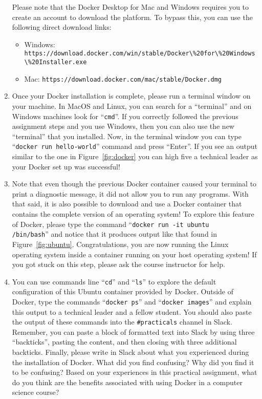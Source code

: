 \documentclass[11pt]{article}
\newcommand{\command}[1]{``\lstinline{#1}''}
\newcommand{\url}[1]{\lstinline{#1}}
\begin{document}
\begin{enumerate}
      Please note that the Docker Desktop for Mac and Windows requires you to
      create an account to download the platform. To bypass this, you can use
      the following direct download links:

    \begin{itemize}
        \item Windows: \\ \url{https://download.docker.com/win/stable/Docker\%20for\%20Windows\%20Installer.exe}
        \item Mac: \url{https://download.docker.com/mac/stable/Docker.dmg}
    \end{itemize}

  \item Once your Docker installation is complete, please run a terminal window
    on your machine. In MacOS and Linux, you can search for a ``terminal'' and
    on Windows machines look for \command{cmd}. If you correctly followed the
    previous assignment steps and you use Windows, then you can also use the new
    ``terminal'' that you installed. Now, in the terminal window you can type
    \command{docker run hello-world} command and press ``Enter''. If you see an
    output similar to the one in Figure~\ref{fig:docker} you can high five a
    technical leader as your Docker set up was successful!

  \item Note that even though the previous Docker container caused your terminal
    to print a diagnostic message, it did not allow you to run any programs.
    With that said, it is also possible to download and use a Docker container
    that contains the complete version of an operating system! To explore this
    feature of Docker, please type the command \command{docker run -it ubuntu
    /bin/bash} and notice that it produces output like that found in
    Figure~\ref{fig:ubuntu}. Congratulations, you are now running the Linux
    operating system inside a container running on your host operating system!
    If you got stuck on this step, please ask the course instructor for help.

  \item You can use commands line \command{cd} and \command{ls} to explore the
    default configuration of this Ubuntu container provided by Docker. Outside
    of Docker, type the commands \command{docker ps} and \command{docker images}
    and explain this output to a technical leader and a fellow student. You
    should also paste the output of these commands into the \url{#practicals}
    channel in Slack. Remember, you can paste a block of formatted text into
    Slack by using three ``backticks'', pasting the content, and then closing
    with three additional backticks. Finally, please write in Slack about what
    you experienced during the installation of Docker. What did you find
    confusing? Why did you find it to be confusing? Based on your experiences in
    this practical assignment, what do you think are the benefits associated
    with using Docker in a computer science course?

\end{enumerate}
\end{document}
